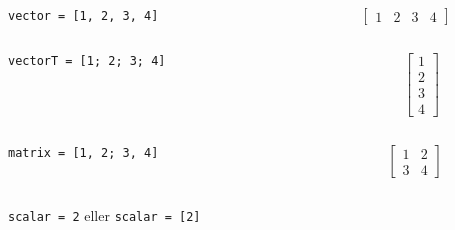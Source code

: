 \begin{frame}
  \begin{example}[Vektor]
    \begin{columns}
      \begin{column}{0.4\columnwidth}
        \texttt{vector = [1, 2, 3, 4]}
      \end{column}
      \begin{column}{0.4\columnwidth}
        $$\begin{bmatrix}
          1 & 2 & 3 & 4
        \end{bmatrix}$$
      \end{column}
    \end{columns}
    \begin{columns}
      \begin{column}{0.4\columnwidth}
        \texttt{vectorT = [1; 2; 3; 4]}
      \end{column}
      \begin{column}{0.4\columnwidth}
        $$\begin{bmatrix}
          1 \\ 2 \\ 3 \\ 4
        \end{bmatrix}$$
      \end{column}
    \end{columns}
  \end{example}
\end{frame}

\begin{frame}
  \begin{example}[Matris]
    \begin{columns}
      \begin{column}{0.4\columnwidth}
        \texttt{matrix = [1, 2; 3, 4]}
      \end{column}
      \begin{column}{0.4\columnwidth}
        $$\begin{bmatrix}
          1 & 2 \\
          3 & 4
        \end{bmatrix}$$
      \end{column}
    \end{columns}
  \end{example}
\end{frame}

\begin{frame}
  \begin{example}[Skalär]
    \texttt{scalar = 2} eller
    \texttt{scalar = [2]}
  \end{example}
\end{frame}


